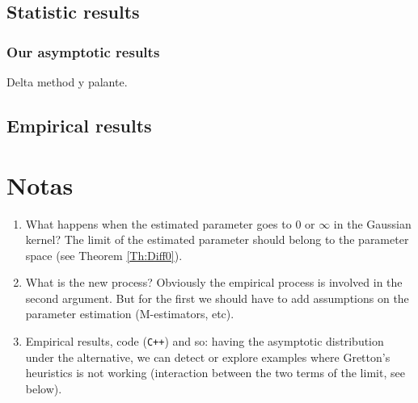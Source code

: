	\subsection{Statistic results}
			\subsubsection*{Our asymptotic results}
				{\color{orange}Delta method y palante.}
	\subsection{Empirical results}	
\section{Notas}
	\begin{enumerate}
		\item What happens when the estimated parameter goes to $0$ or $\infty$ in the Gaussian kernel? The limit of the estimated parameter should belong to the parameter space (see Theorem \ref{Th:Diff0}).
		\item What is the new process? Obviously the empirical process is involved in the second argument. But for the first we should have to add assumptions on the parameter estimation (M-estimators, etc).
		\item Empirical results, code (\verb!C++!) and so: having the asymptotic distribution under the alternative, we can detect or explore examples where Gretton's heuristics is not working (interaction between the two terms of the limit, see below).
	\end{enumerate}